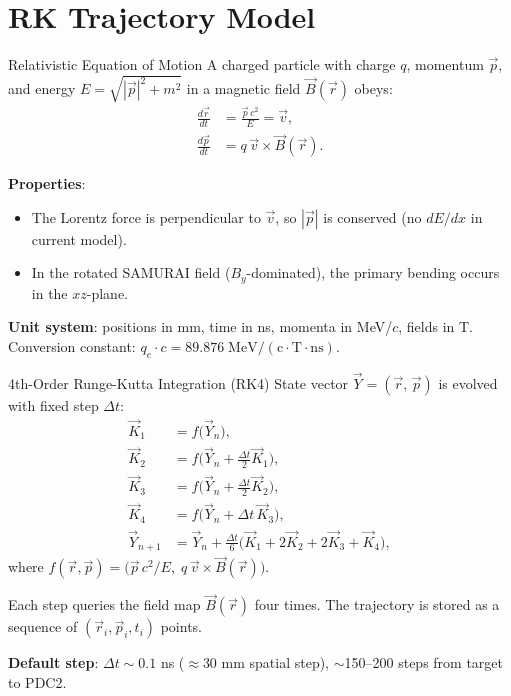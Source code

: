 \documentclass[aspectratio=169]{beamer}
\begin{document}
\section{RK Trajectory Model}

\begin{frame}{Relativistic Equation of Motion}
\small
A charged particle with charge $q$, momentum $\vec{p}$, and energy $E = \sqrt{|\vec{p}|^2 + m^2}$ in a magnetic field $\vec{B}(\vec{r})$ obeys:
\begin{align}
\frac{d\vec{r}}{dt} &= \frac{\vec{p}\,c^2}{E} = \vec{v}, \\[4pt]
\frac{d\vec{p}}{dt} &= q\,\vec{v} \times \vec{B}(\vec{r}).
\end{align}

\textbf{Properties}:
\begin{itemize}
\item The Lorentz force is perpendicular to $\vec{v}$, so $|\vec{p}|$ is conserved (no $dE/dx$ in current model).
\item In the rotated SAMURAI field ($B_y$-dominated), the primary bending occurs in the $xz$-plane.
\end{itemize}

\vspace{0.2cm}
\textbf{Unit system}: positions in mm, time in ns, momenta in MeV/$c$, fields in T.\\
Conversion constant: $q_e \cdot c = 89.876\;\mathrm{MeV/(c \cdot T \cdot ns)}$.
\end{frame}

\begin{frame}{4th-Order Runge-Kutta Integration (RK4)}
\small
State vector $\vec{Y} = (\vec{r},\, \vec{p})$ is evolved with fixed step $\Delta t$:
\begin{align*}
\vec{K}_1 &= f\bigl(\vec{Y}_n\bigr), \\
\vec{K}_2 &= f\bigl(\vec{Y}_n + \tfrac{\Delta t}{2}\vec{K}_1\bigr), \\
\vec{K}_3 &= f\bigl(\vec{Y}_n + \tfrac{\Delta t}{2}\vec{K}_2\bigr), \\
\vec{K}_4 &= f\bigl(\vec{Y}_n + \Delta t\,\vec{K}_3\bigr), \\[4pt]
\vec{Y}_{n+1} &= \vec{Y}_n + \frac{\Delta t}{6}\bigl(\vec{K}_1 + 2\vec{K}_2 + 2\vec{K}_3 + \vec{K}_4\bigr),
\end{align*}
where $f(\vec{r}, \vec{p}) = \bigl(\vec{p}\,c^2/E,\; q\,\vec{v}\times\vec{B}(\vec{r})\bigr)$.

\vspace{0.2cm}
Each step queries the field map $\vec{B}(\vec{r})$ four times. The trajectory is stored as a sequence of $(\vec{r}_i, \vec{p}_i, t_i)$ points.

\vspace{0.2cm}
\textbf{Default step}: $\Delta t \sim 0.1$ ns ($\approx 30$ mm spatial step), $\sim$150--200 steps from target to PDC2.
\end{frame}
\end{document}
